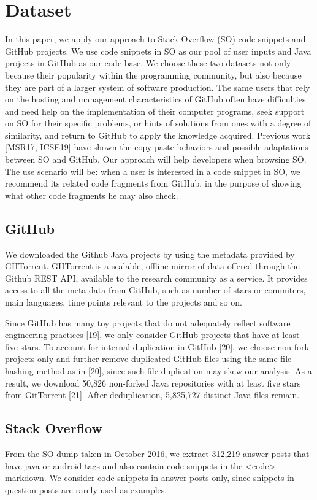 \section{Dataset}
\label{sec:dataset}
In this paper, we apply our approach to Stack Overflow (SO) code snippets and GitHub projects. We use code snippets in SO as our pool of user inputs and Java projects in GitHub as our code base. We choose these two datasets not only because their popularity within the programming community, but also because they are part of a larger system of software production. The same users that rely on the hosting and management characteristics of GitHub often have difficulties and need help on the implementation of their computer programs, seek support on SO for their specific problems, or hints of solutions from ones with a degree of similarity, and return to GitHub to apply the knowledge acquired. Previous work [MSR17, ICSE19] have shown the copy-paste behaviors and possible adaptations between SO and GitHub. Our approach will help developers when browsing SO. The use scenario will be: when a user is interested in a code snippet in SO, we recommend its related code fragments from GitHub, in the purpose of showing what other code fragments he may also check. 


\subsection{GitHub}
We downloaded the Github Java projects by using the metadata provided by GHTorrent. GHTorrent is a scalable, offline mirror of data offered through the Github REST API, available to the research community as a service. It provides access to all the meta-data from GitHub, such as number of stars or commiters, main languages, time points relevant to the projects and so on.

Since GitHub has many toy projects that do not adequately reflect software engineering practices [19], we only consider GitHub projects that have at least five stars. To account for internal duplication in GitHub [20], we choose non-fork projects only and further remove duplicated GitHub files using the same file hashing method as in [20], since such file duplication may skew our analysis. As a result, we download 50,826 non-forked Java repositories with at least five stars from GitTorrent [21]. After deduplication, 5,825,727 distinct Java files remain.


\subsection{Stack Overflow}
From the SO dump taken in October 2016, we extract 312,219 answer posts that have java or android tags and also contain code snippets in the <code> markdown. We consider code snippets in answer posts only, since snippets in question posts are rarely used as examples. 

